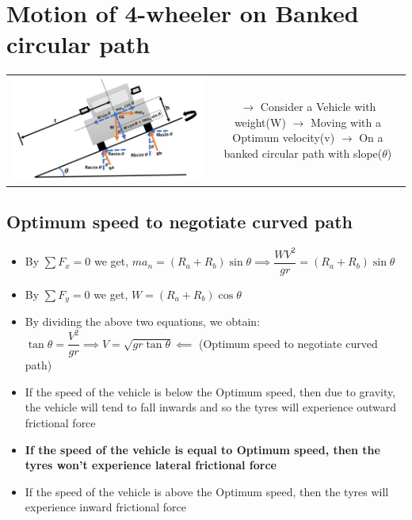 \documentclass[8pt]{report}
\begin{document}
\section{Motion of 4-wheeler on Banked circular path}
	\begin{table}[H]
		\begin{tabular}{cc}
			\parbox{4cm}{\includegraphics[scale=0.45]{vehiclebanked.png}} & \hspace{6.5cm}
			\parbox{12cm}{$\rightarrow$ Consider a Vehicle with weight(W)\\\\$\rightarrow$ Moving with a Optimum velocity(v)\\\\$\rightarrow$ On a banked circular path with slope($\theta$)\\\\}
		\end{tabular}
	\end{table}
	\subsection{Optimum speed to negotiate curved path}
	\begin{itemize}
		\item By $\sum F_x=0$ we get, $ma_n=(R_a+R_b)\sin\theta \implies \dfrac{WV^2}{gr}=(R_a+R_b)\sin\theta$
		\item By $\sum F_y=0$ we get, $W=(R_a+R_b)\cos\theta$
		\item By dividing the above two equations, we obtain: $\tan\theta=\dfrac{V^2}{gr} \implies \boxed{V=\sqrt{gr\tan\theta}} \impliedby$ (Optimum speed to negotiate curved path)
		\item If the speed of the vehicle is below the Optimum speed, then due to gravity, the vehicle will tend to fall inwards and so the tyres will experience outward frictional force
		\item \textbf{If the speed of the vehicle is equal to Optimum speed, then the tyres won't experience lateral frictional force}
		\item If the speed of the vehicle is above the Optimum speed, then the tyres will experience inward frictional force
	\end{itemize}\hrulefill
\end{document}
